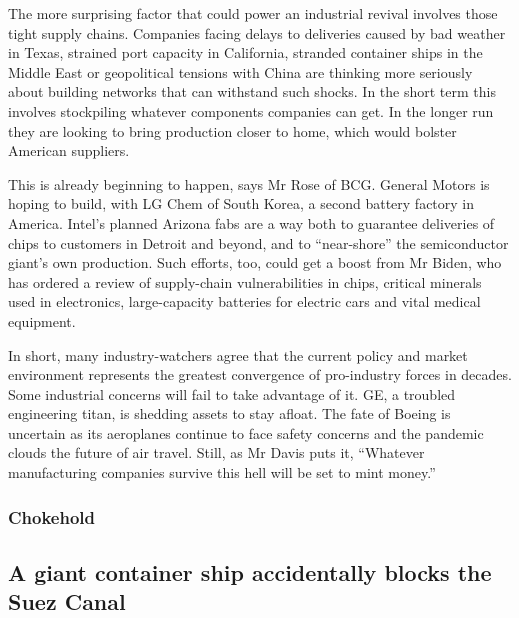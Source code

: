 \documentclass{article}
\begin{document}
The more surprising factor that could power an industrial revival involves those tight supply chains. Companies facing delays to deliveries caused by bad weather in Texas, strained port capacity in California, stranded container ships in the Middle East or geopolitical tensions with China are thinking more seriously about building networks that can withstand such shocks. In the short term this involves stockpiling whatever components companies can get. In the longer run they are looking to bring production closer to home, which would bolster American suppliers. 

This is already beginning to happen, says Mr Rose of BCG. General Motors is hoping to build, with LG Chem of South Korea, a second battery factory in America. Intel's planned Arizona fabs are a way both to guarantee deliveries of chips to customers in Detroit and beyond, and to ``near-shore'' the semiconductor giant's own production. Such efforts, too, could get a boost from Mr Biden, who has ordered a review of supply-chain vulnerabilities in chips, critical minerals used in electronics, large-capacity batteries for electric cars and vital medical equipment. 

In short, many industry-watchers agree that the current policy and market environment represents the greatest convergence of pro-industry forces in decades. Some industrial concerns will fail to take advantage of it. GE, a troubled engineering titan, is shedding assets to stay afloat. The fate of Boeing is uncertain as its aeroplanes continue to face safety concerns and the pandemic clouds the future of air travel. Still, as Mr Davis puts it, ``Whatever manufacturing companies survive this hell will be set to mint money.'' {} 
\clearpage
\subsubsection{Chokehold }
\subsection{A giant container ship accidentally blocks the Suez Canal }
\end{document}
